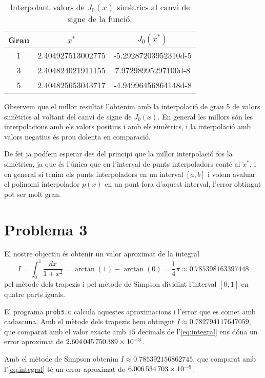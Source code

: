 \documentclass[12pt]{article}
\numberwithin{table}{section}
\numberwithin{figure}{section}
\numberwithin{equation}{section}
\begin{document}
\begin{table}[htb]
	\sffamily \small	\centering
	\caption{Interpolant valors de $J_0(x)$ simètrics al canvi de signe de la funció.}	
	\begin{tabular}{cS[table-parse-only]S[table-parse-only]}
		\toprule
		{Grau} & { \( x^{\ast} \) } & { \( J_0(x^{\ast}) \) } \\
		 & 2.404927513002775 & -5.29287203952310d-5\\
		3 & 2.404824021911155 & 7.97298995297100d-8\\
		5 & 2.404825653043717 & -4.94996456864148d-8\\
	\end{tabular}
\end{table}

Observem que el millor resultat l'obtenim amb la interpolació de grau 5 de valors simètrics al voltant del canvi de signe de $J_0(x)$. En general les millors són les interpolacions amb els valors positius i amb els simètrics, i la interpolació amb valors negatius és prou dolenta en comparació.

De fet ja podíem esperar des del principi que la millor interpolació fos la simètrica, ja que és l'única que en l'interval de punts interpoladors conté al $x^*$, i en general si tenim els punts interpoladors en un interval $[a,b]$ i volem avaluar el polinomi interpolador $p(x)$ en un punt fora d'aquest interval, l'error obtingut pot ser molt gran.

\newpage

\section{Problema 3}
El nostre objectiu és obtenir un valor aproximat de la integral
\begin{equation}\label{eq:integral}
	I=\int^{1}_0\dfrac{dx}{1+x^2} = \arctan(1) - \arctan(0) = \frac{1}{4}\pi \approx \num{0.785398163397448}
\end{equation}
pel mètode dels trapezis i pel mètode de Simpson dividint l'interval $[0,1]$ en quatre parts iguals.

El programa \texttt{prob3.c} calcula aquestes aproximacions i l'error que es comet amb cadascuna. Amb el mètode dels trapezis hem obtingut $I \approx \num{0.782794117647059}$, que comparat amb el valor exacte amb $15$ decimals de l'\cref{eq:integral} ens dóna un error aproximat de $\num{2.604045750389d-3}$.


Amb el mètode de Simpson obtenim $I \approx \num{0.785392156862745}$, que comparat amb l'\cref{eq:integral} té un error aproximat de $\num{6.006534703d-6}$.
\end{document}
